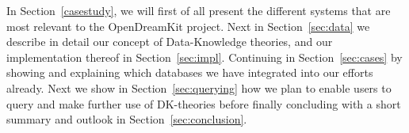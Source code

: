 In Section~\ref{casestudy}, we will first of all present the different systems that are
most relevant to the OpenDreamKit project. Next in Section~\ref{sec:data} we describe in
detail our concept of Data-Knowledge theories, and our implementation thereof in
Section~\ref{sec:impl}. Continuing in Section~\ref{sec:cases} by showing and explaining
which databases we have integrated into our efforts already. Next we show in
Section~\ref{sec:querying} how we plan to enable users to query and make further use of
DK-theories before finally concluding with a short summary and outlook in
Section~\ref{sec:conclusion}.

